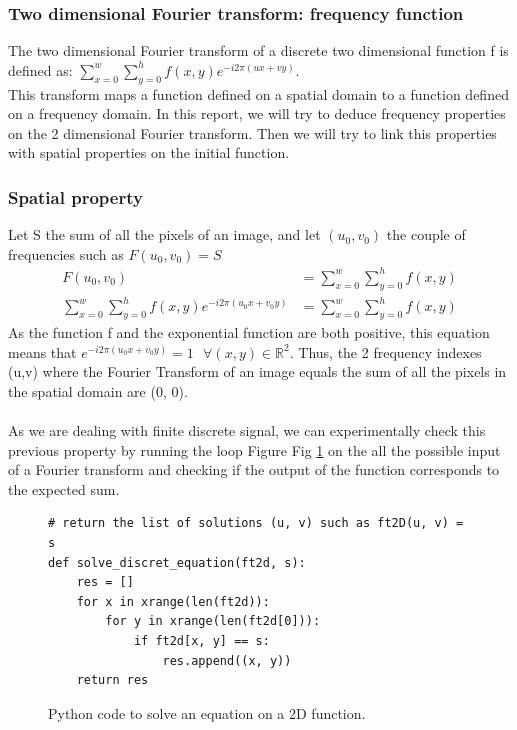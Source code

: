 \documentclass[a4paper]{article}
\begin{document}
        \subsubsection{Two dimensional Fourier transform: frequency function}
        The two dimensional Fourier transform of a discrete two dimensional function f is defined as: $\sum_{x=0}^{w}{\sum_{y=0}^{h}{f(x, y)e^{-i 2 \pi(u x + v y)}}}$.\\
        This transform maps a function defined on a spatial domain to a function defined on a frequency domain.   In this report, we will try to deduce frequency properties
        on the 2 dimensional Fourier transform.   Then we will try to link this properties with spatial properties on the initial function.



        \subsubsection{Spatial property}
        Let S the sum of all the pixels of an image, and let $(u_{0}, v_{0})$ the couple of frequencies such as $F(u_{0}, v_{0}) = S$
        \begin{equation*}
        \begin{aligned}
          F(u_{0}, v_{0}) &= \sum_{x=0}^{w}{\sum_{y=0}^{h}{f(x, y)}} \\
          \sum_{x=0}^{w}{\sum_{y=0}^{h}{f(x, y)e^{-i 2 \pi(u_{0} x + v_{0} y)}}}&= \sum_{x=0}^{w}{\sum_{y=0}^{h}{f(x, y)}}
        \end{aligned}
        \end{equation*}
        As the function f and the exponential function are both positive, this equation means that $e^{-i 2 \pi(u_{0} x + v_{0} y)} = 1 \text { } \forall (x, y) \in \mathbb{R} ^{2}$. Thus, the 2 frequency indexes (u,v) where the Fourier Transform of an image equals the sum of all the pixels in the spatial domain are (0, 0).\\\\
        As we are dealing with finite discrete signal, we can experimentally check this previous property by running the loop Figure Fig \ref{solve_discret_equation.py} on the all the possible input of a Fourier transform and checking if the output of the function corresponds to the expected sum.
        \begin{figure}[ht!]
	    \lstset{language=Python}
	    \begin{lstlisting}
# return the list of solutions (u, v) such as ft2D(u, v) = s
def solve_discret_equation(ft2d, s):
    res = []
    for x in xrange(len(ft2d)):
        for y in xrange(len(ft2d[0])):
            if ft2d[x, y] == s:
                res.append((x, y))
    return res
        \end{lstlisting}
        \caption{Python code to solve an equation on a 2D function.}
	    \label{solve_discret_equation.py}
		\end{figure}
\end{document}
